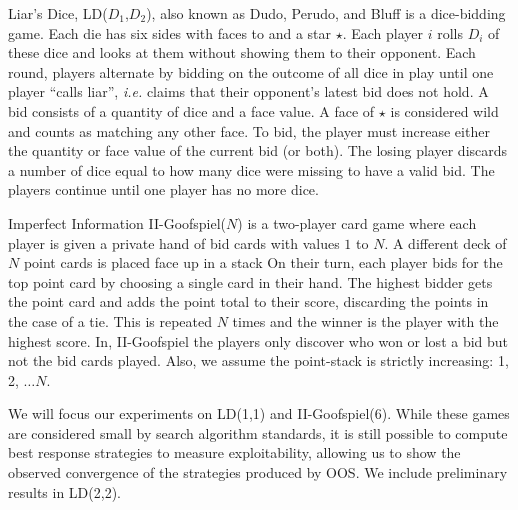 \documentclass[letterpaper]{article}
\newcommand{\ie}{{\it i.e.}\xspace}
\begin{document}
Liar's Dice, LD($D_1$,$D_2$), also known as Dudo, Perudo, and Bluff is a dice-bidding game. 
Each die has six sides with faces  to  and a star $\star$. 
Each player $i$ rolls $D_i$ of these dice and looks at them without showing them to their opponent. 
Each round, players alternate by bidding on the outcome of all dice in play until one player ``calls liar'', 
\ie claims that their opponent's latest bid does not hold.
A bid consists of a quantity of dice and a face value.  
A face of $\star$ is considered wild and counts as matching any other face.
To bid, the player must increase either the quantity or face value of the current 
bid (or both). The losing player discards a number of dice equal to how many dice were missing 
to have a valid bid. The players continue until one player has no more dice.

Imperfect Information II-Goofspiel($N$) is a two-player card game where each player is
given a private hand of bid cards with values $1$ to $N$. A different
deck of $N$ point cards is placed face up in a stack 
On their turn, each player bids for the top point card by 
choosing a single card in their hand. 
The highest bidder gets the point card and adds the point total to their score, discarding
the points in the case of a tie. 
This is repeated $N$ times and the winner is the player with the highest score.
In, II-Goofspiel the players only discover who won or lost a bid but not the bid cards played.
Also, we assume the point-stack is strictly increasing: 1, 2, $\ldots N$.


We will focus our experiments on LD(1,1) and II-Goofspiel(6). While these games are considered small by 
search algorithm standards, it is still possible to compute best response strategies to measure exploitability, 
allowing us to show the observed convergence of the strategies
produced by OOS. We include preliminary results in LD(2,2). 
\end{document}
